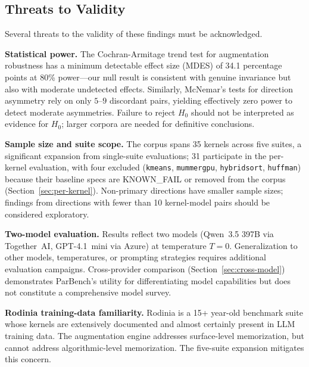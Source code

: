 \documentclass[conference]{IEEEtran}
\begin{document}
\subsection{Threats to Validity}
\label{sec:threats}

Several threats to the validity of these findings must be acknowledged.

\textbf{Statistical power.}
The Cochran-Armitage trend test for augmentation robustness has
a minimum detectable effect size (MDES) of 34.1 percentage points
at 80\% power---our null result is consistent with genuine
invariance but also with moderate undetected effects.
Similarly, McNemar's tests for direction asymmetry rely on only
$5$--$9$ discordant pairs, yielding effectively zero power to
detect moderate asymmetries.
Failure to reject $H_0$ should not be interpreted as evidence
for $H_0$; larger corpora are needed for definitive conclusions.

\textbf{Sample size and suite scope.} The corpus spans 35 kernels across five suites, a significant expansion from single-suite evaluations; 31 participate in the per-kernel evaluation, with four excluded (\texttt{kmeans}, \texttt{mummergpu}, \texttt{hybridsort}, \texttt{huffman}) because their baseline specs are KNOWN\_FAIL or removed from the corpus (Section~\ref{sec:per-kernel}). Non-primary directions have smaller sample sizes; findings from directions with fewer than 10 kernel-model pairs should be considered exploratory.

\textbf{Two-model evaluation.}
Results reflect two models (Qwen~3.5 397B via Together~AI, GPT-4.1~mini via Azure) at temperature $T{=}0$. Generalization to other models, temperatures, or prompting strategies requires additional evaluation campaigns.
Cross-provider comparison (Section~\ref{sec:cross-model}) demonstrates ParBench's utility for differentiating model capabilities but does not constitute a comprehensive model survey. %

\textbf{Rodinia training-data familiarity.} Rodinia is a 15+ year-old benchmark suite whose kernels are extensively documented and almost certainly present in LLM training data. The augmentation engine addresses surface-level memorization, but cannot address algorithmic-level memorization. The five-suite expansion mitigates this concern.
\end{document}
